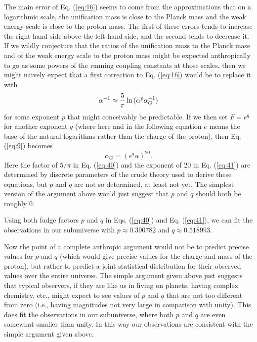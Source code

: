 \documentclass[a4paper,12pt]{article}
\begin{document}
	The main error of Eq. (\ref{eq:16}) seems to come from
the approximations that on a logarithmic scale,
the unification mass is close to the Planck mass
and the weak energy scale is close to the proton mass.
The first of these errors tends to increase the right hand side
above the left hand side, and the second tends to decrease it.
If we wildly conjecture that the ratios of the unification mass
to the Planck mass and of the weak energy scale to the proton mass
might be expected anthropically to go as some powers of the running
coupling constants at those scales,
then we might na\"{\i}vely expect that a first correction to
Eq. (\ref{eq:16}) would be to replace it with
 \begin{equation}
 \alpha^{-1} \approx {5\over\pi}\ln{(\alpha^p\alpha_G^{-1})}
 \label{eq:40}
 \end{equation}
for some exponent $p$ that might conceivably be predictable.
If we then set $F = e^q$ for another exponent $q$
(where here and in the following equation $e$ means the base
of the natural logarithms rather than the charge of the proton),
then Eq. (\ref{eq:9}) becomes
 \begin{equation}
 \alpha_G = (e^q \alpha)^{20}.
 \label{eq:41}
 \end{equation}
Here the factor of $5/\pi$ in Eq. (\ref{eq:40})
and the exponent of 20 in Eq. (\ref{eq:41})
are determined by discrete parameters of the crude theory
used to derive these equations,
but $p$ and $q$ are not so determined, at least not yet.
The simplest version of the argument above would
just suggest that $p$ and $q$ should both be roughly 0.

	Using both fudge factors $p$ and $q$
in Eqs. (\ref{eq:40}) and Eq. (\ref{eq:41}),
we can fit the observations in our subuniverse
with $p \approx 0.390782$ and $q \approx 0.518993$.

	Now the point of a complete anthropic argument
would not be to predict precise values for $p$ and $q$
(which would give precise values for the charge and mass of the proton),
but rather to predict a joint statistical distribution for their
observed values over the entire universe.
The simple argument given above just suggests that typical observers,
if they are like us in living on planets, having complex chemistry, etc.,
might expect to see values of $p$ and $q$ that are not
too different from zero
(i.e., having magnitudes not very large in comparison with unity).
This does fit the observations in our subuniverse,
where both $p$ and $q$ are even somewhat smaller than unity.
In this way our observations are consistent with
the simple argument given above.
\end{document}

